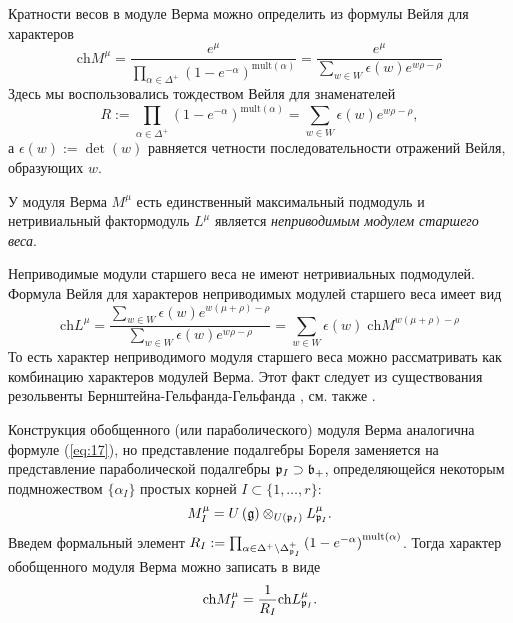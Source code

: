 Кратности весов в модуле Верма можно определить из формулы Вейля для характеров
\begin{equation}
  \label{eq:11}
  \mathrm{ch} M^{\mu}=\frac{e^{\mu}}{\prod_{\alpha\in \Delta^{+}} \left( 1-e^{-\alpha}\right)^{\mathrm{mult}(\alpha)}}=\frac{e^{\mu}}{\sum_{w\in W} \epsilon(w) e^{w\rho-\rho}}
\end{equation}
Здесь мы воспользовались тождеством Вейля для знаменателей
\begin{equation}
  \label{eq:12}
  R:=\prod_{\alpha\in \Delta^{+}} \left( 1-e^{-\alpha}\right)^{\mathrm{mult}(\alpha)}=\sum_{w\in W} \epsilon(w) e^{w\rho-\rho},
\end{equation}
а $\epsilon \left( w\right) :=\det \left( w\right)$ равняется четности последовательности отражений Вейля, образующих $w$.

У модуля Верма  $M^{\mu}$ есть единственный максимальный подмодуль и нетривиальный фактормодуль $L^{\mu}$ является 
{\it неприводимым модулем старшего веса}. 

Неприводимые модули старшего веса не имеют нетривиальных подмодулей. 
Формула Вейля для характеров неприводимых модулей старшего веса имеет вид
\begin{equation}
  \label{eq:13}
  \mathrm{ch} L^{\mu}=\frac{\sum_{w\in W} \epsilon(w) e^{w(\mu+\rho)-\rho}}{\sum_{w\in W}\epsilon(w) e^{w\rho-\rho}}=\sum_{w\in W} \epsilon(w)\; \mathrm{ch} M^{w(\mu+\rho)-\rho}
\end{equation}
То есть характер неприводимого модуля старшего веса можно рассматривать как комбинацию характеров модулей Верма. Этот факт следует из существования резольвенты Бернштейна-Гельфанда-Гельфанда \cite{bernstein1976category,bernstein1971structure}, см. также
\cite{humphreys2008representations}.

Конструкция обобщенного (или параболического) модуля Верма аналогична формуле (\ref{eq:17}), но представление подалгебры Бореля заменяется на представление параболической подалгебры $\mathfrak{p}_{I}\supset \mathfrak{b}_{+}$, определяющейся некоторым подмножеством  $\{\alpha_{I}\}$ простых корней $I\subset \{1,\dots, r\}$:
\begin{equation*}
M_{I}^{\mu}=U\left( \mathfrak{g}\right)\otimes _{U\left( \mathfrak{p}_{I}\right) }L_{\mathfrak{p}_{I}}^{\mu}.
\end{equation*}
Введем формальный элемент $R_{I}:=\prod_{\alpha \in \Delta
^{+}\setminus \Delta _{\mathfrak{p}_{I}}^{+}}\left( 1-e^{-\alpha }\right)
^{\mathrm{mult}(\alpha )}$. Тогда характер обобщенного модуля Верма можно записать в виде
\begin{equation}
  \label{eq:18}
  \mathrm{ch}M_{I}^{\mu}=\frac{1}{R_{I}}\mathrm{ch}L_{\mathfrak{p}_{I}}^{\mu }.
\end{equation}

